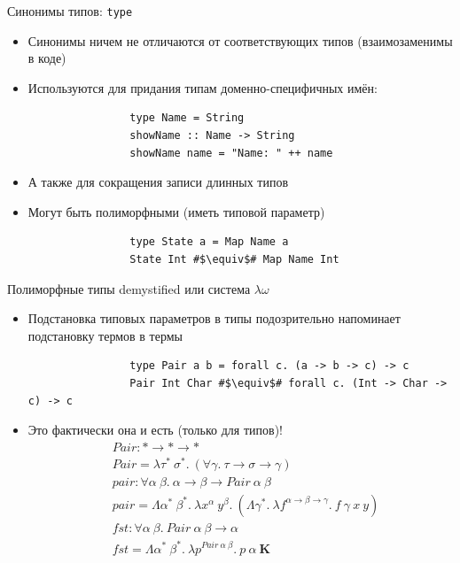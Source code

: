     \begin{frame}[fragile]{Синонимы типов: \texttt{type}}
        \begin{itemize}
            \item Синонимы ничем не отличаются от соответствующих типов (взаимозаменимы в коде)
            \item Используются для придания типам доменно-специфичных имён:
            \begin{verbatim}
                type Name = String
                showName :: Name -> String
                showName name = "Name: " ++ name
            \end{verbatim}
            \item А также для сокращения записи длинных типов
            \item Могут быть полиморфными (иметь типовой параметр)
            \begin{verbatim}
                type State a = Map Name a
                State Int #$\equiv$# Map Name Int
            \end{verbatim}
        \end{itemize}
    \end{frame}

    \begin{frame}[fragile]{Полиморфные типы demystified или система $\lambda \omega$ \advancedslide\popslide}
        \begin{itemize}
            \item Подстановка типовых параметров в типы подозрительно напоминает подстановку термов в термы
            \begin{verbatim}
                type Pair a b = forall c. (a -> b -> c) -> c
                Pair Int Char #$\equiv$# forall c. (Int -> Char -> c) -> c
            \end{verbatim}
            \item[\advanced] Это фактически она и есть (только для типов)!
            \begin{align*}
                &Pair : * \rightarrow * \rightarrow * \\
                &Pair = \lambda \tau^*~\sigma^*.~(\forall \gamma.~\tau\rightarrow\sigma\rightarrow\gamma) \\
                &pair : \forall \alpha~\beta.~\alpha \rightarrow \beta \rightarrow Pair~\alpha~\beta \\
                &pair = \Lambda \alpha^*~\beta^*.~\lambda x^\alpha~y^\beta.~(\Lambda \gamma^*.~\lambda f^{\alpha\rightarrow\beta\rightarrow\gamma}.~f~\gamma~x~y) \\
                &fst : \forall \alpha~\beta.~Pair~\alpha~\beta\rightarrow \alpha \\
                &fst = \Lambda \alpha^*~\beta^*.~\lambda p^{Pair~\alpha~\beta}.~p~\alpha~\mathbf{K}
            \end{align*}
        \end{itemize}
    \end{frame}

